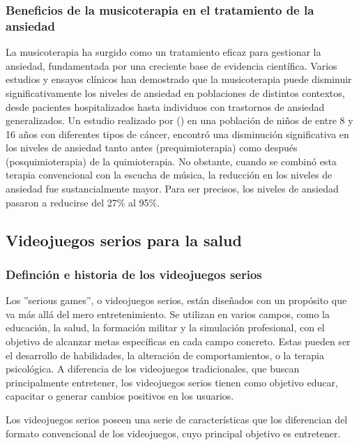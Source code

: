 \subsubsection{Beneficios de la musicoterapia en el tratamiento de la ansiedad}

La musicoterapia ha surgido como un tratamiento eficaz para gestionar la ansiedad, fundamentada por una creciente base de evidencia científica. Varios estudios y ensayos clínicos han demostrado que la musicoterapia puede disminuir significativamente los niveles de ansiedad en poblaciones de distintos contextos, desde pacientes hospitalizados hasta individuos con trastornos de ansiedad generalizados. Un estudio realizado por \citeauthor{SEPULVEDA:2014} (\citeyear{SEPULVEDA:2014}) en una población de niños de entre 8 y 16 años con diferentes tipos de cáncer, encontró una disminución significativa en los niveles de ansiedad tanto antes (prequimioterapia) como después (posquimioterapia) de la quimioterapia. No obstante, cuando se combinó esta terapia convencional con la escucha de música, la reducción en los niveles de ansiedad fue sustancialmente mayor. Para ser precisos, los niveles de ansiedad pasaron a reducirse del 27\% al 95\%.

\subsection{Videojuegos serios para la salud}

\subsubsection{Definción e historia de los videojuegos serios}

Los ''serious games'', o videojuegos serios, están diseñados con un propósito que va más allá del mero entretenimiento. Se utilizan en varios campos, como la educación, la salud, la formación militar y la simulación profesional, con el objetivo de alcanzar metas específicas en cada campo concreto. Estas pueden ser el desarrollo de habilidades, la alteración de comportamientos, o la terapia psicológica. A diferencia de los videojuegos tradicionales, que buscan principalmente entretener, los videojuegos serios tienen como objetivo educar, capacitar o generar cambios positivos en los usuarios.

Los videojuegos serios poseen una serie de características que los diferencian del formato convencional de los videojuegos, cuyo principal objetivo es entretener.

